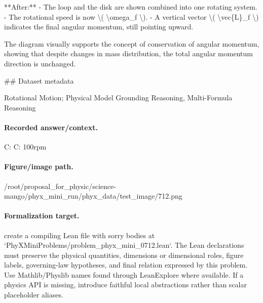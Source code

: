 **After:**
- The loop and the disk are shown combined into one rotating system.
- The rotational speed is now \textbackslash{}( \textbackslash{}omega\_f \textbackslash{}).
- A vertical vector \textbackslash{}( \textbackslash{}vec\{L\}\_f \textbackslash{}) indicates the final angular momentum, still pointing upward.

The diagram visually supports the concept of conservation of angular momentum, showing that despite changes in mass distribution, the total angular momentum direction is unchanged.

\#\# Dataset metadata

Rotational Motion; Physical Model Grounding Reasoning, Multi-Formula Reasoning

\paragraph{Recorded answer/context.}
C: C: 100rpm

\paragraph{Figure/image path.}
/root/proposal\_for\_physic/science-mango/phyx\_mini\_run/phyx\_data/test\_image/712.png

\paragraph{Formalization target.}
create a compiling Lean file with sorry bodies at `PhyXMiniProblems/problem\_phyx\_mini\_0712.lean`. The Lean declarations must preserve the physical quantities, dimensions or dimensional roles, figure labels, governing-law hypotheses, and final relation expressed by this problem.
Use Mathlib/Physlib names found through LeanExplore where available. If a physics API is missing, introduce faithful local abstractions rather than scalar placeholder aliases.

